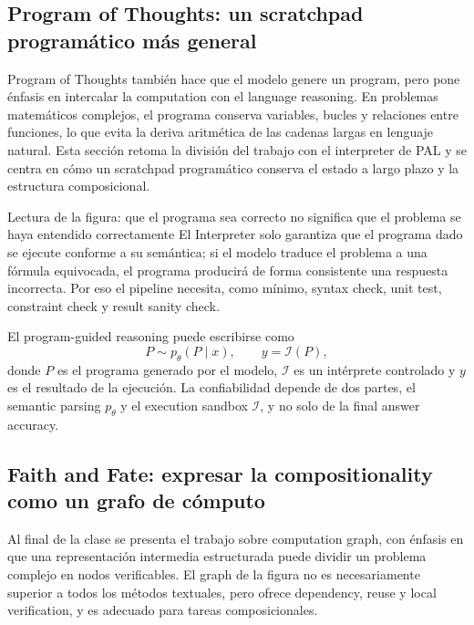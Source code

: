 \subsection{Program of Thoughts: un scratchpad programático más general}

Program of Thoughts también hace que el modelo genere un program, pero pone énfasis en intercalar la computation con el language reasoning. En problemas matemáticos complejos, el programa conserva variables, bucles y relaciones entre funciones, lo que evita la deriva aritmética de las cadenas largas en lenguaje natural. Esta sección retoma la división del trabajo con el interpreter de PAL y se centra en cómo un scratchpad programático conserva el estado a largo plazo y la estructura composicional.


\begin{knowledgebox}{Lectura de la figura: que el programa sea correcto no significa que el problema se haya entendido correctamente}
El Interpreter solo garantiza que el programa dado se ejecute conforme a su semántica; si el modelo traduce el problema a una fórmula equivocada, el programa producirá de forma consistente una respuesta incorrecta. Por eso el pipeline necesita, como mínimo, syntax check, unit test, constraint check y result sanity check.
\end{knowledgebox}

El program-guided reasoning puede escribirse como
\[
P\sim p_\theta(P\mid x),\qquad y=\mathcal{I}(P),
\]
donde $P$ es el programa generado por el modelo, $\mathcal{I}$ es un intérprete controlado y $y$ es el resultado de la ejecución. La confiabilidad depende de dos partes, el semantic parsing $p_\theta$ y el execution sandbox $\mathcal{I}$, y no solo de la final answer accuracy.

\subsection{Faith and Fate: expresar la compositionality como un grafo de cómputo}

Al final de la clase se presenta el trabajo sobre computation graph, con énfasis en que una representación intermedia estructurada puede dividir un problema complejo en nodos verificables. El graph de la figura no es necesariamente superior a todos los métodos textuales, pero ofrece dependency, reuse y local verification, y es adecuado para tareas composicionales.

